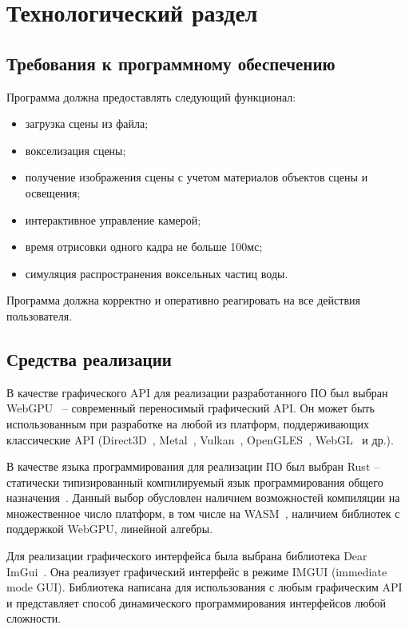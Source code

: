 \chapter{Технологический раздел}

\section{Требования к программному обеспечению}

Программа должна предоставлять следующий функционал:
\begin{itemize}
    \item загрузка сцены из файла;
    \item вокселизация сцены;
    \item получение изображения сцены с учетом материалов объектов сцены и освещения;
    \item интерактивное управление камерой;
    \item время отрисовки одного кадра не больше 100мс;
    \item симуляция распространения воксельных частиц воды.
\end{itemize}

Программа должна корректно и оперативно реагировать на все действия пользователя.

\section{Средства реализации}

В качестве графического API для реализации разработанного ПО 
был выбран WebGPU~\cite{WebGPU} -- современный переносимый графический
API.
Он может быть использованным при разработке на любой из платформ, 
поддерживающих классические API (Direct3D~\cite{DirectX12}, 
Metal~\cite{Metal}, Vulkan~\cite{Vulkan}, OpenGLES~\cite{OpenGLES}, WebGL~\cite{WebGL} и др.).

В качестве языка программирования для реализации ПО был выбран Rust -- 
статически типизированный компилируемый язык программирования общего назначения~\cite{Rust}.
Данный выбор обусловлен наличием возможностей 
компиляции на множественное число платформ, в том числе на WASM~\cite{WASM}, наличием
библиотек с поддержкой WebGPU, линейной алгебры.

Для реализации графического интерфейса была выбрана библиотека Dear ImGui~\cite{ImGui}.
Она реализует графический интерфейс в режиме IMGUI (immediate mode GUI). Библиотека написана 
для использования с любым графическим API и представляет способ динамического 
программирования интерфейсов любой сложности.

